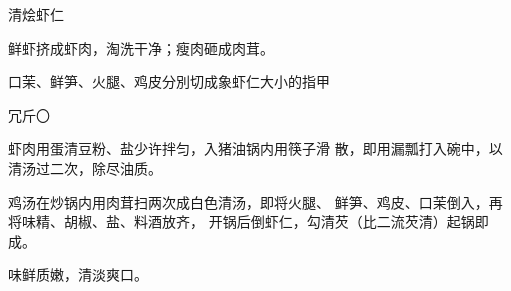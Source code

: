 \begin{recipe}{清烩虾仁}

\ingredients




\cooking

\step 鲜虾挤成虾肉，淘洗干净；瘦肉砸成肉茸。

\step 口茉、鲜笋、火腿、鸡皮分別切成象虾仁大小的指甲

冗斤〇

\step 虾肉用蛋清豆粉、盐少许拌匀，入猪油锅内用筷子滑 散，即用漏瓢打入碗中，以清汤过二次，除尽油质。

\step 鸡汤在炒锅内用肉茸扫两次成白色清汤，即将火腿、 鲜笋、鸡皮、口茉倒入，再将味精、胡椒、盐、料酒放齐， 开锅后倒虾仁，勾清芡（比二流芡清）起锅即成。

\notes

味鲜质嫩，清淡爽口。

\end{recipe}


